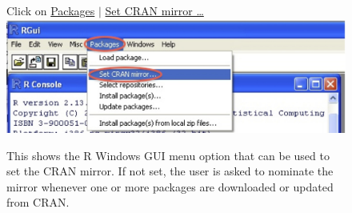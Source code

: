 \documentclass{tufte-book}\usepackage[]{graphicx}\usepackage[]{color}
\begin{document}
\begin{figure}[h]
 Click on \underline{Packages} $\mid$ \underline{Set CRAN mirror \ldots}\\[6pt]
\includegraphics{figs-inc/16i-win-mirrors.jpg}
\caption{This shows the R Windows GUI menu option that can be used to
  set the CRAN mirror.  If not set, the user is asked to nominate the
  mirror whenever one or more packages are downloaded or updated from
  CRAN.}
\end{figure}
\vspace*{-18pt}


\end{document}
